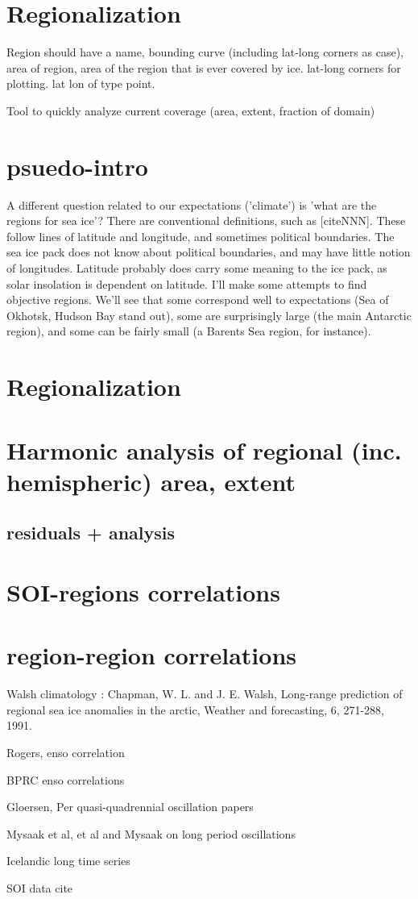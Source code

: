 \section{Regionalization}
Region should have a name, bounding curve (including lat-long corners as case), 
area of region, area of the region that is ever covered by ice.
lat-long corners for plotting.  lat lon of type point.

Tool to quickly analyze current coverage (area, extent, fraction of domain)


\section{psuedo-intro}
A different question related to our expectations ('climate') is 'what are the
regions for sea ice'?  There are conventional definitions, such as [citeNNN].
These follow lines of latitude and longitude, and sometimes political boundaries.
The sea ice pack does not know about political boundaries, and may have little
notion of longitudes.  Latitude probably does carry some meaning to the
ice pack, as solar insolation is dependent on latitude.  I'll make some 
attempts to find objective regions.  We'll see that some correspond well to
expectations (Sea of Okhotsk, Hudson Bay stand out), some are surprisingly
large (the main Antarctic region), and some can be fairly small (a Barents Sea
region, for instance).

\section{Regionalization}


\section{Harmonic analysis of regional (inc. hemispheric) area, extent}
  \subsection{residuals + analysis}
\section{SOI-regions correlations}
\section{region-region correlations}


  Walsh climatology : Chapman, W. L. and J. E. Walsh, Long-range prediction
of regional sea ice anomalies in the arctic, Weather and forecasting, 6,
271-288, 1991.

Rogers, enso correlation

BPRC enso correlations

Gloersen, Per quasi-quadrennial oscillation papers

Mysaak et al, et al and Mysaak on long period oscillations

Icelandic long time series

SOI data cite
